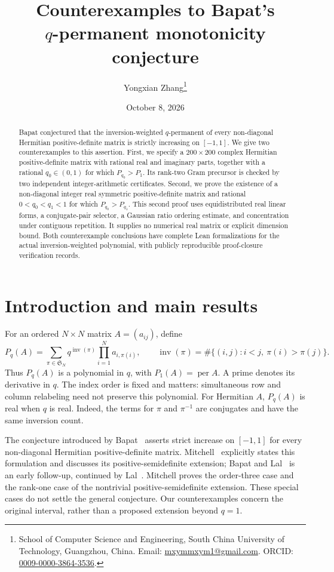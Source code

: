 \documentclass[11pt]{article}
\title{Counterexamples to Bapat's\protect\\$q$-permanent monotonicity conjecture}
\author{Yongxian Zhang\thanks{School of Computer Science and Engineering,
South China University of Technology, Guangzhou, China.
Email: \href{mailto:mxymmxym1@gmail.com}{mxymmxym1@gmail.com}.
ORCID: \href{https://orcid.org/0009-0000-3864-3536}{0009-0000-3864-3536}.}}
\date{October 8, 2026}
\theoremstyle{remark}
\DeclareMathOperator{\per}{per}
\DeclareMathOperator{\inv}{inv}
\begin{document}
\maketitle
\begin{abstract}
Bapat conjectured that the inversion-weighted $q$-permanent of every
non-diagonal Hermitian positive-definite matrix is strictly increasing on
$[-1,1]$. We give two counterexamples to this assertion. First, we specify
a $200\times200$ complex Hermitian positive-definite matrix with rational
real and imaginary parts, together with a rational $q_0\in(0,1)$ for which
$P_{q_0}>P_1$. Its rank-two Gram precursor is checked by two independent
integer-arithmetic certificates. Second, we prove the existence of a
non-diagonal integer real symmetric positive-definite matrix and rational
$0<q_0<q_1<1$ for which $P_{q_0}>P_{q_1}$. This second proof uses
equidistributed real linear forms, a conjugate-pair selector, a Gaussian
ratio ordering estimate, and concentration under contiguous repetition.
It supplies no numerical real matrix or explicit dimension bound.
Both counterexample conclusions have complete Lean formalizations for
the actual inversion-weighted polynomial, with publicly reproducible
proof-closure verification records.
\end{abstract}

\section{Introduction and main results}
For an ordered $N\times N$ matrix $A=(a_{ij})$, define
\begin{equation}\label{eq:qper}
 P_q(A)=\sum_{\pi\in\mathfrak S_N}q^{\inv(\pi)}
             \prod_{i=1}^N a_{i,\pi(i)},\qquad
 \inv(\pi)=\#\{(i,j):i<j,\ \pi(i)>\pi(j)\}.
\end{equation}
Thus $P_q(A)$ is a polynomial in $q$, with $P_1(A)=\per A$.
A prime denotes its derivative in $q$. The index order is fixed and
matters: simultaneous row and column relabeling need not preserve this
polynomial. For Hermitian $A$, $P_q(A)$ is real when $q$ is real.
Indeed, the terms for $\pi$ and $\pi^{-1}$ are conjugates and have the
same inversion count.

The conjecture introduced by Bapat~\cite{Bapat1992} asserts strict
increase on $[-1,1]$ for every non-diagonal Hermitian positive-definite
matrix. Mitchell~\cite{Mitchell} explicitly states this formulation and
discusses its positive-semidefinite extension; Bapat and
Lal~\cite{BapatLal1994} is an early follow-up, continued by
Lal~\cite{Lal1998}. Mitchell proves the order-three case and the
rank-one case of the nontrivial positive-semidefinite extension.
These special cases do not settle the general conjecture.
Our counterexamples concern the original interval, rather than a
proposed extension beyond $q=1$.
\end{document}
